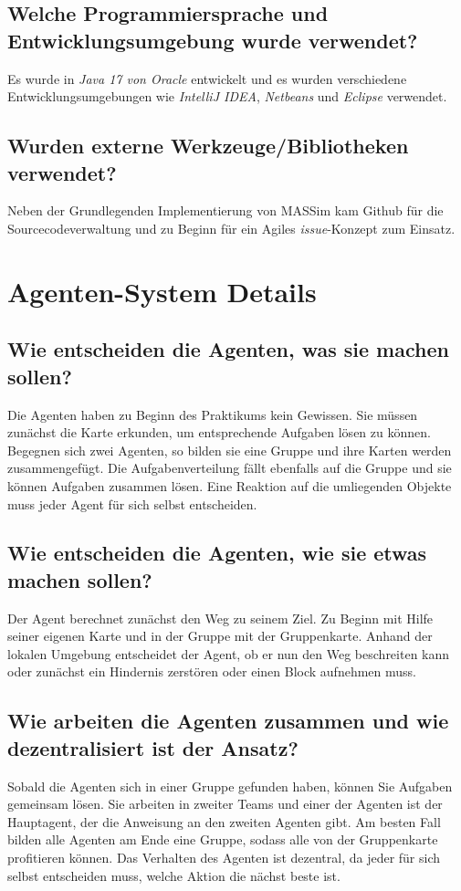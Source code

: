 \subsection{Welche Programmiersprache und Entwicklungsumgebung wurde verwendet?}
Es wurde in \textit{Java 17 von Oracle} entwickelt und es wurden verschiedene Entwicklungsumgebungen wie \textit{IntelliJ IDEA}, \textit{Netbeans} und \textit{Eclipse} verwendet.

\subsection{Wurden externe Werkzeuge/Bibliotheken verwendet?}
Neben der Grundlegenden Implementierung von MASSim kam Github für die Sourcecodeverwaltung und zu Beginn für ein Agiles \textit{issue}-Konzept zum Einsatz.

\section{Agenten-System Details}
\subsection{Wie entscheiden die Agenten, was sie machen sollen?}
Die Agenten haben zu Beginn des Praktikums kein Gewissen. Sie müssen zunächst die Karte erkunden, um entsprechende Aufgaben lösen zu können. Begegnen sich zwei Agenten, so bilden sie eine Gruppe und ihre Karten werden zusammengefügt. Die Aufgabenverteilung fällt ebenfalls auf die Gruppe und sie können Aufgaben zusammen lösen. Eine Reaktion auf die umliegenden Objekte muss jeder Agent für sich selbst entscheiden.

\subsection{Wie entscheiden die Agenten, wie sie etwas machen sollen?}
Der Agent berechnet zunächst den Weg zu seinem Ziel. Zu Beginn mit Hilfe seiner eigenen Karte und in der Gruppe mit der Gruppenkarte. Anhand der lokalen Umgebung entscheidet der Agent, ob er nun den Weg beschreiten kann oder zunächst ein Hindernis zerstören oder einen Block aufnehmen muss.

\subsection{Wie arbeiten die Agenten zusammen und wie dezentralisiert ist der Ansatz?}
Sobald die Agenten sich in einer Gruppe gefunden haben, können Sie Aufgaben gemeinsam lösen. Sie arbeiten in zweiter Teams und einer der Agenten ist der Hauptagent, der die Anweisung an den zweiten Agenten gibt. Am besten Fall bilden alle Agenten am Ende eine Gruppe, sodass alle von der Gruppenkarte profitieren können.
Das Verhalten des Agenten ist dezentral, da jeder für sich selbst entscheiden muss, welche Aktion die nächst beste ist.

